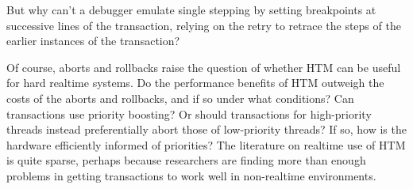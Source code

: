 \QuickQuiz{}
	But why can't a debugger emulate single stepping by setting
	breakpoints at successive lines of the transaction, relying
	on the retry to retrace the steps of the earlier instances
	of the transaction?
 \QuickQuizEnd

Of course, aborts and rollbacks raise the question of whether HTM can
be useful for hard realtime systems.
Do the performance benefits of HTM outweigh the costs of the aborts
and rollbacks, and if so under what conditions?
Can transactions use priority boosting?
Or should transactions for high-priority threads instead preferentially
abort those of low-priority threads?
If so, how is the hardware efficiently informed of priorities?
The literature on realtime use of HTM is quite sparse, perhaps because
researchers are finding more than enough problems in getting
transactions to work well in non-realtime environments.

